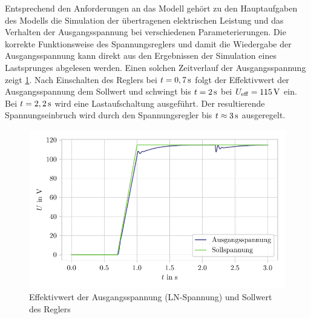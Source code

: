 Entsprechend den Anforderungen an das Modell gehört zu den Hauptaufgaben des Modells die Simulation der übertragenen elektrischen Leistung und das Verhalten der Ausgangsspannung bei verschiedenen Parameterierungen. Die korrekte Funktionsweise des Spannungsreglers und damit die Wiedergabe der Ausgangsspannung kann direkt aus den Ergebnissen der Simulation eines Lastsprunges abgelesen werden. Einen solchen Zeitverlauf der Ausgangsspannung zeigt \cref{fig:Verifikation_Spannung}. Nach Einschalten des Reglers bei $t=\unit[0,7]{s}$ folgt der Effektivwert der Ausgangsspannung dem Sollwert und schwingt bis $t=\unit[2]{s}$ bei $U_{\mathrm{eff}}=\unit[115]{V}$ ein. Bei $t=\unit[2,2]{s}$ wird eine Lastaufschaltung ausgeführt. Der resultierende Spannungseinbruch wird durch den Spannungsregler bis $t\approx\unit[3]{s}$ ausgeregelt.
\begin{figure}
    \centering
    \includegraphics{Bilder/Verifikation_Spannung.pdf}
    \caption{Effektivwert der Ausgangsspannung (LN-Spannung) und Sollwert des Reglers}
    \label{fig:Verifikation_Spannung}
\end{figure}

